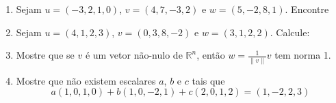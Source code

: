 \documentclass[a4paper,5pt]{amsbook}
\newcommand{\ds}{\displaystyle}
\begin{document}
\vspace{1cm}
\begin{enumerate}
	\vspace{0.5cm}
    \item Sejam $u=(-3,2,1,0)$, $v=(4,7,-3,2)$ e $w=(5,-2,8,1)$. Encontre


	\vspace{0.5cm}
	\item Sejam $u = (4,1,2,3)$, $v = (0,3,8,-2)$ e $w = (3,1,2,2)$. Calcule:


	\vspace{0.5cm}
    \item Mostre que se $v$ \'e um vetor n\~ao-nulo de $\mathbb{R}^n$, ent\~ao
        $w=\frac{1}{\|v\|}v$ tem norma 1.

	\vspace{0.5cm}
	\item Mostre que n\~ao existem escalares $a$, $b$ e $c$ tais que
		\[a(1,0,1,0)+b(1,0,-2,1)+c(2,0,1,2)=(1,-2,2,3)\]


\end{enumerate}
\end{document}
